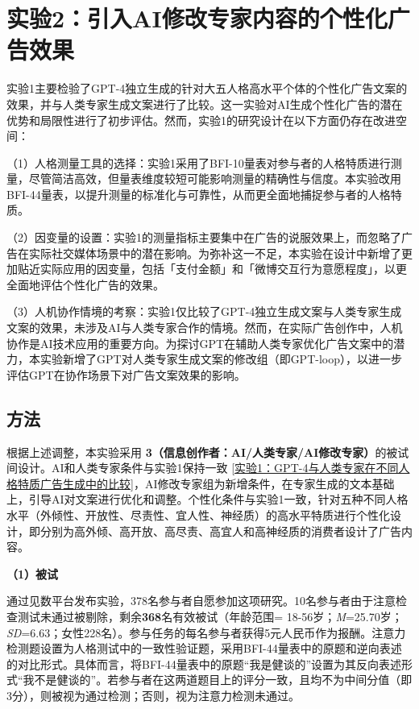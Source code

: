 \section{实验2：引入AI修改专家内容的个性化广告效果}
实验1主要检验了GPT-4独立生成的针对大五人格高水平个体的个性化广告文案的效果，并与人类专家生成文案进行了比较。这一实验对AI生成个性化广告的潜在优势和局限性进行了初步评估。然而，实验1的研究设计在以下方面仍存在改进空间：

（1）人格测量工具的选择：实验1采用了BFI-10量表对参与者的人格特质进行测量，尽管简洁高效，但量表维度较短可能影响测量的精确性与信度。本实验改用BFI-44量表，以提升测量的标准化与可靠性，从而更全面地捕捉参与者的人格特质。

（2）因变量的设置：实验1的测量指标主要集中在广告的说服效果上，而忽略了广告在实际社交媒体场景中的潜在影响。为弥补这一不足，本实验在设计中新增了更加贴近实际应用的因变量，包括「支付金额」和「微博交互行为意愿程度」，以更全面地评估个性化广告的效果。

（3）人机协作情境的考察：实验1仅比较了GPT-4独立生成文案与人类专家生成文案的效果，未涉及AI与人类专家合作的情境。然而，在实际广告创作中，人机协作是AI技术应用的重要方向。为探讨GPT在辅助人类专家优化广告文案中的潜力，本实验新增了GPT对人类专家生成文案的修改组（即GPT-loop），以进一步评估GPT在协作场景下对广告文案效果的影响。

\subsection{方法}
根据上述调整，本实验采用 \textbf{3（信息创作者：AI/人类专家/AI修改专家）}的被试间设计。AI和人类专家条件与实验1保持一致 \ref{实验1：GPT-4与人类专家在不同人格特质广告生成中的比较}，AI修改专家组为新增条件，在专家生成的文本基础上，引导AI对文案进行优化和调整。个性化条件与实验1一致，针对五种不同人格水平（外倾性、开放性、尽责性、宜人性、神经质）的高水平特质进行个性化设计，即分别为高外倾、高开放、高尽责、高宜人和高神经质的消费者设计了广告内容。

\textbf{（1）被试}

通过见数平台发布实验，378名参与者自愿参加这项研究。10名参与者由于注意检查测试未通过被剔除，剩余\textbf{368}名有效被试（年龄范围= 18-56岁；\textit{M}=25.70岁；\textit{SD}=6.63；女性228名）。参与任务的每名参与者获得5元人民币作为报酬。注意力检测题设置为人格测试中的一致性验证题，采用BFI-44量表中的原题和逆向表述的对比形式。具体而言，将BFI-44量表中的原题“我是健谈的”设置为其反向表述形式“我不是健谈的”。若参与者在这两道题目上的评分一致，且均不为中间分值（即3分），则被视为通过检测；否则，视为注意力检测未通过。


